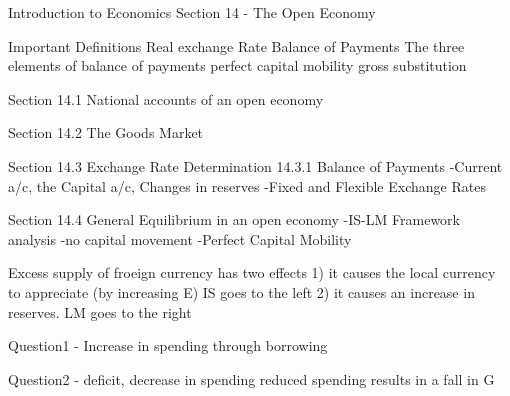 Introduction to Economics
Section 14 - The Open Economy
 
Important Definitions
Real exchange Rate
Balance of Payments
The three elements of balance of payments 
perfect capital mobility
gross substitution
 
 
Section 14.1 National accounts of an open economy
 
Section 14.2 The Goods Market
 
Section 14.3 Exchange Rate Determination
14.3.1 Balance of Payments
    -Current a/c, the Capital a/c, Changes in reserves
    -Fixed and Flexible Exchange Rates
 
Section 14.4 General Equilibrium in an open economy
-IS-LM Framework analysis
-no capital movement
-Perfect Capital Mobility
 
Excess supply of froeign currency has two effects
1) it causes the local currency to appreciate (by increasing E)
    IS goes to the left
2) it causes an increase in reserves.
    LM goes to the right
 
 
Question1 - Increase in spending through borrowing
 
Question2 - deficit, decrease in spending
reduced spending results in a fall in G
